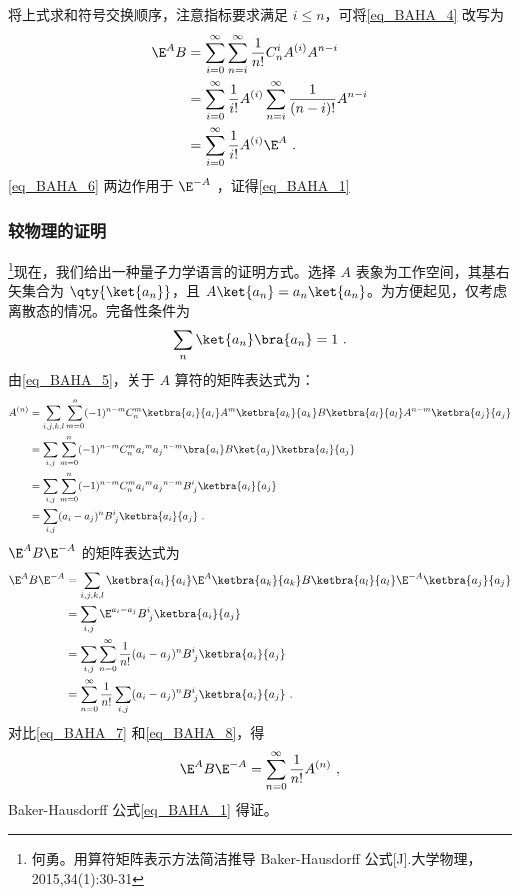 将上式求和符号交换顺序，注意指标要求满足 $i\leq n$，可将\autoref{eq_BAHA_4} 改写为
\begin{equation}\label{eq_BAHA_6}
\begin{aligned}
\E^A B&=\sum_{i=0}^{\infty}\sum_{n=i}^{\infty}\frac{1}{n!}C_{n}^iA^{(i)}A^{n-i}\\
&=\sum_{i=0}^{\infty}\frac{1}{i!}A^{(i)}\sum_{n=i}^{\infty}\frac{1}{(n-i)!}A^{n-i}\\
&=\sum_{i=0}^{\infty}\frac{1}{i!}A^{(i)}\E^A~.
\end{aligned}
\end{equation}
\autoref{eq_BAHA_6} 两边作用于 $\E^{-A}$ ，证得\autoref{eq_BAHA_1} 

\subsubsection{较物理的证明}
\footnote{何勇。用算符矩阵表示方法简洁推导 Baker-Hausdorff 公式[J].大学物理，2015,34(1):30-31}现在，我们给出一种量子力学语言的证明方式。选择 $A$ 表象为工作空间，其基右矢集合为 $\qty{\ket{a_n}}$，且 $A\ket{a_n}=a_n\ket{a_n}$。为方便起见，仅考虑离散态的情况。完备性条件为
\begin{equation}
\sum_{n}\ket{a_n}\bra{a_n}=1~.
\end{equation}
由\autoref{eq_BAHA_5}，关于 $A$ 算符的矩阵表达式为：
\begin{equation}\label{eq_BAHA_7}
\begin{aligned}
A^{(n)}&=\sum_{i,j,k,l}\sum_{m=0}^{n}(-1)^{n-m}C_{n}^{m}\ketbra{a_i}{a_i}A^m\ketbra{a_k}{a_k}B\ketbra{a_l}{a_l}A^{n-m}\ketbra{a_j}{a_j}\\
&=\sum_{i,j}\sum_{m=0}^{n}(-1)^{n-m}C_n^m{a_i}^m{a_j}^{n-m}\bra{a_i}B\ket{a_j}\ketbra{a_i}{a_j}\\
&=\sum_{i,j}\sum_{m=0}^{n}(-1)^{n-m}C_n^m{a_i}^m{a_j}^{n-m}B^i_{\; j}\ketbra{a_i}{a_j}\\
&=\sum_{i,j}(a_i-a_j)^nB^i_{\; j}\ketbra{a_i}{a_j}~.
\end{aligned}
\end{equation}
$\E^{A}B\E^{-A}$ 的矩阵表达式为
\begin{equation}\label{eq_BAHA_8}
\begin{aligned}
\E^{A}B\E^{-A}&=\sum_{i,j,k,l}\ketbra{a_i}{a_i}\E^{A}\ketbra{a_k}{a_k}B\ketbra{a_l}{a_l}\E^{-A}\ketbra{a_j}{a_j}\\
&=\sum_{i,j}\E^{a_i-a_j}B^{i}_{\;j}\ketbra{a_i}{a_j}\\
&=\sum_{i,j}\sum_{n=0}^{\infty}\frac{1}{n!}(a_i-a_j)^nB^{i}_{\;j}\ketbra{a_i}{a_j}\\
&=\sum_{n=0}^{\infty}\frac{1}{n!}\sum_{i,j}(a_i-a_j)^nB^{i}_{\;j}\ketbra{a_i}{a_j}~.
\end{aligned}
\end{equation}
对比\autoref{eq_BAHA_7} 和\autoref{eq_BAHA_8}，得
\begin{equation}
\E^{A}B\E^{-A}=\sum_{n=0}^{\infty}\frac{1}{n!}A^{(n)}~,
\end{equation}
Baker-Hausdorff 公式\autoref{eq_BAHA_1} 得证。

